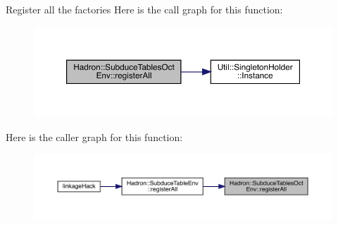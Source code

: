 Register all the factories Here is the call graph for this function\+:\nopagebreak
\begin{figure}[H]
\begin{center}
\leavevmode
\includegraphics[width=350pt]{d7/db0/namespaceHadron_1_1SubduceTablesOctEnv_a51ef987c89c5e4509cb7c7c24fb152d6_cgraph}
\end{center}
\end{figure}
Here is the caller graph for this function\+:\nopagebreak
\begin{figure}[H]
\begin{center}
\leavevmode
\includegraphics[width=350pt]{d7/db0/namespaceHadron_1_1SubduceTablesOctEnv_a51ef987c89c5e4509cb7c7c24fb152d6_icgraph}
\end{center}
\end{figure}
